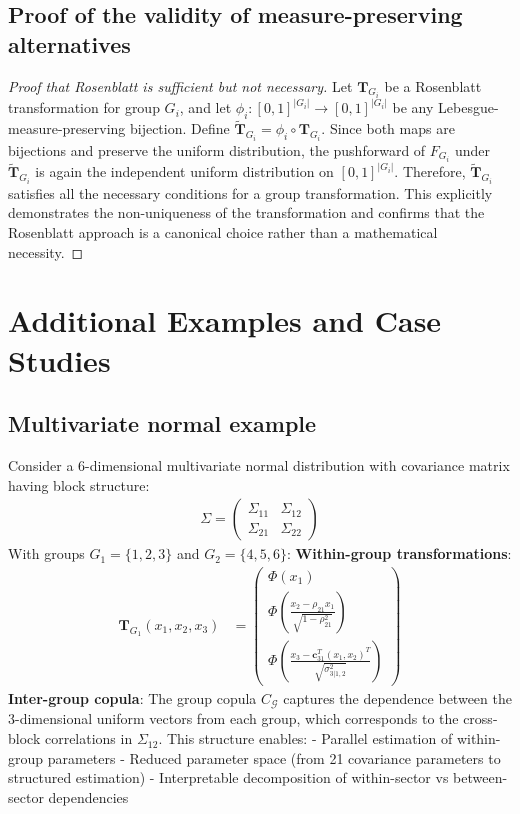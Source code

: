 \subsection{Proof of the validity of measure-preserving alternatives}
\begin{proof}[Proof that Rosenblatt is sufficient but not necessary]
Let $\mathbf{T}_{G_i}$ be a Rosenblatt transformation for group $G_i$, and let $\phi_i: [0,1]^{|G_i|} \to [0,1]^{|G_i|}$ be any Lebesgue-measure-preserving bijection. Define $\tilde{\mathbf{T}}_{G_i} = \phi_i \circ \mathbf{T}_{G_i}$. Since both maps are bijections and preserve the uniform distribution, the pushforward of $F_{G_i}$ under $\tilde{\mathbf{T}}_{G_i}$ is again the independent uniform distribution on $[0,1]^{|G_i|}$. Therefore, $\tilde{\mathbf{T}}_{G_i}$ satisfies all the necessary conditions for a group transformation. This explicitly demonstrates the non-uniqueness of the transformation and confirms that the Rosenblatt approach is a canonical choice rather than a mathematical necessity.
\end{proof}

\section{Additional Examples and Case Studies}
\subsection{Multivariate normal example}
\begin{example}
Consider a 6-dimensional multivariate normal distribution with covariance matrix having block structure:
\begin{align}
\Sigma = \begin{pmatrix}
\Sigma_{11} & \Sigma_{12} \\
\Sigma_{21} & \Sigma_{22}
\end{pmatrix}
\end{align}
With groups $G_1 = \{1,2,3\}$ and $G_2 = \{4,5,6\}$:
\textbf{Within-group transformations}:
\begin{align}
\mathbf{T}_{G_1}(x_1, x_2, x_3) &= \begin{pmatrix}
\Phi(x_1) \\
\Phi\left(\frac{x_2 - \rho_{21}x_1}{\sqrt{1-\rho_{21}^2}}\right) \\
\Phi\left(\frac{x_3 - \mathbf{c}_{31}^T(x_1, x_2)^T}{\sqrt{\sigma_{3|1,2}^2}}\right)
\end{pmatrix}
\end{align}
\textbf{Inter-group copula}: The group copula $C_{\mathcal{G}}$ captures the dependence between the 3-dimensional uniform vectors from each group, which corresponds to the cross-block correlations in $\Sigma_{12}$.
This structure enables:
- Parallel estimation of within-group parameters
- Reduced parameter space (from 21 covariance parameters to structured estimation)
- Interpretable decomposition of within-sector vs between-sector dependencies
\end{example}

